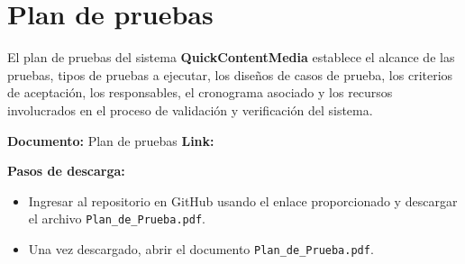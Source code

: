 \section{Plan de pruebas}
El plan de pruebas del sistema \textbf{QuickContentMedia} establece el alcance de las pruebas, tipos de pruebas a ejecutar, los diseños de casos de prueba, los criterios de aceptación, los responsables, el cronograma asociado y los recursos involucrados en el proceso de validación y verificación del sistema.

\textbf{Documento:} Plan de pruebas
\newline
\textbf{Link: \linkPlanPruebas} 

\textbf{Pasos de descarga:}
\begin{itemize}
    \item Ingresar al repositorio en GitHub usando el enlace proporcionado y descargar el archivo \texttt{Plan\_de\_Prueba.pdf}.
    \item Una vez descargado, abrir el documento \texttt{Plan\_de\_Prueba.pdf}.
\end{itemize}

